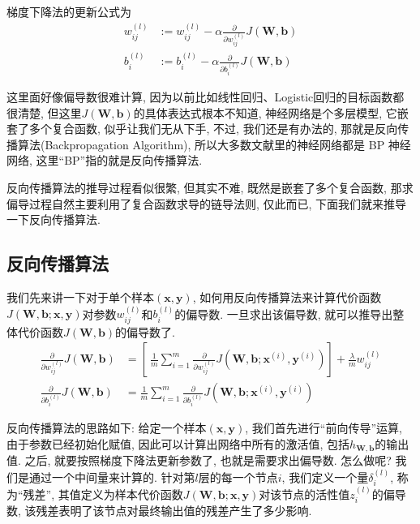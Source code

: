 \documentclass[a4paper,UTF8]{ctexart}
\theoremstyle{plain} \newtheorem{theorem}{定理}[section]
\theoremstyle{plain} \newtheorem{definition}{定义}[section]
\theoremstyle{plain} \newtheorem{lemma}{引理}[section]
\theoremstyle{plain} \newtheorem{proposition}{命题}[section]
\theoremstyle{plain} \newtheorem{example}{例}[section]
\theoremstyle{plain} \newtheorem{remark}{注}[section]
\theoremstyle{plain} \newtheorem{corollary}{推论}[section]
\begin{document}
梯度下降法的更新公式为
\begin{align*}
w_{ij}^{(l)} & := w_{ij}^{(l)} - \alpha \frac{\partial}{\partial w_{ij}^{(l)}} J(\bm{W}, \bm{b}) \\ 
b_{i}^{(l)} & := b_{i}^{(l)} - \alpha \frac{\partial}{\partial b_{i}^{(l)}} J(\bm{W}, \bm{b})
\end{align*}

这里面好像偏导数很难计算, 因为以前比如线性回归、Logistic回归的目标函数都很清楚, 但这里$J(\bm{W},\bm{b})$的具体表达式根本不知道, 神经网络是个多层模型, 它嵌套了多个复合函数, 似乎让我们无从下手, 不过, 我们还是有办法的, 那就是反向传播算法(Backpropagation Algorithm), 所以大多数文献里的神经网络都是 BP 神经网络, 这里“BP”指的就是反向传播算法.

反向传播算法的推导过程看似很繁, 但其实不难, 既然是嵌套了多个复合函数, 那求偏导过程自然主要利用了复合函数求导的链导法则, 仅此而已, 下面我们就来推导一下反向传播算法.


\subsection{反向传播算法}
我们先来讲一下对于单个样本$(\bm{x},\bm{y})$, 如何用反向传播算法来计算代价函数$J(\bm{W},\bm{b}; \bm{x},\bm{y})$对参数$w_{ij}^{(l)}$和$b_{i}^{(l)}$的偏导数. 一旦求出该偏导数, 就可以推导出整体代价函数$J(\bm{W},\bm{b})$的偏导数了.
\begin{align*}
\frac{\partial}{\partial w_{ij}^{(l)}} J(\bm{W},\bm{b}) & = \left[\ \frac{1}{m} \sum_{i=1}^{m} \frac{\partial}{\partial w_{ij}^{(l)}} J(\bm{W},\bm{b}; \bm{x}^{(i)},\bm{y}^{(i)}) \right] + \frac{\lambda}{m} w_{ij}^{(l)} \\ 
\frac{\partial}{\partial b_{i}^{(l)}} J(\bm{W},\bm{b}) & = \frac{1}{m} \sum_{i=1}^{m} \frac{\partial}{\partial b_{i}^{(l)}} J(\bm{W},\bm{b}; \bm{x}^{(i)},\bm{y}^{(i)})
\end{align*}

反向传播算法的思路如下: 给定一个样本$(\bm{x}, \bm{y})$, 我们首先进行“前向传导”运算, 由于参数已经初始化赋值, 因此可以计算出网络中所有的激活值, 包括$h_{\bm{W},\bm{b}}$的输出值. 之后, 就要按照梯度下降法更新参数了, 也就是需要求出偏导数. 怎么做呢? 我们是通过一个中间量来计算的. 针对第$l$层的每一个节点$i$, 我们定义一个量$\delta_{i}^{(l)}$, 称为“残差”, 其值定义为样本代价函数$J(\bm{W},\bm{b}; \bm{x},\bm{y})$对该节点的活性值$z_{i}^{(l)}$的偏导数, 该残差表明了该节点对最终输出值的残差产生了多少影响.
\end{document}
